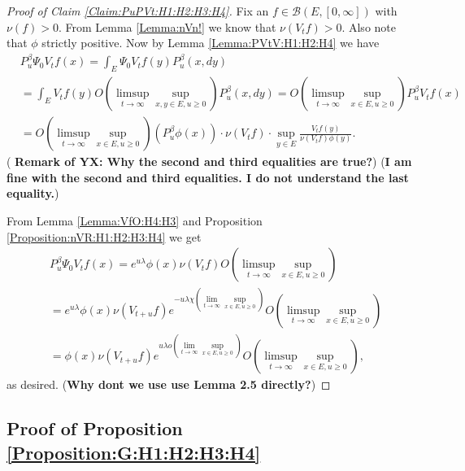 \documentclass[12pt,a4paper]{amsart}
\numberwithin{equation}{section}
\theoremstyle{plain}
\theoremstyle{definition}
\theoremstyle{remark}
\begin{document}
\begin{proof}[Proof of Claim \ref{Claim:PuPVt:H1:H2:H3:H4}]
Fix an $f\in \mathcal B(E,[0,\infty])$ with $\nu(f)>0$.
From Lemma \ref{Lemma:nVn!} we know that $\nu(V_tf)>0$.
Also note that $\phi$ strictly positive.
Now by Lemma \ref{Lemma:PVtV:H1:H2:H4}  we have
\begin{align}
 &P_u^\beta \Psi_0 V_{t} f(x)
 = \int_{E} \Psi_0V_tf(y) P_u^\beta (x,dy)
 \\&=\int_{E} V_tf(y) O(\limsup_{t\to \infty} \sup_{x,y\in E, u\geq 0}) P_u^\beta (x,dy)
 = O(\limsup_{t\to \infty}\sup_{x\in E,u\geq 0}) P_u^\beta V_t f(x)
  \\&= O(\limsup_{t\to \infty}\sup_{x\in E,u\geq 0}) (P_u^\beta \phi(x)) \cdot \nu(V_{t}f) \cdot\sup_{y\in E} \frac{V_tf(y)}{\nu(V_{t}f)\phi(y)}.
 \end{align}
( {\bf Remark of YX: Why the second and third equalities are true?})
({\bf I am fine with the second and third equalities. I do not understand the last equality.})
 
From Lemma \ref{Lemma:VfO:H4:H3} and Proposition \ref{Proposition:nVR:H1:H2:H3:H4} we get
\begin{align}
 &P_u^\beta \Psi_0 V_{t} f(x)
 = e^{u\lambda} \phi(x) \nu(V_tf)O(\limsup_{t\to \infty} \sup_{x\in E, u \geq 0})
 \\&= e^{u\lambda }\phi(x)\nu(V_{t+u}f) e^{-u \lambda \chi(\lim_{t\to \infty} \sup_{x\in E, u\geq 0})} O(\limsup_{t\to \infty} \sup_{x\in E, u\geq 0})
 \\&= \phi(x) \nu(V_{t+u}f) e^{u\lambda o(\lim_{t\to \infty} \sup_{x\in E, u\geq 0})} O(\limsup_{t\to \infty}\sup_{x\in E, u\geq 0}),
 \end{align}
as desired. ({\bf Why dont we use use Lemma 2.5 directly?})
\end{proof}
\subsection{Proof of Proposition \ref{Proposition:G:H1:H2:H3:H4}}
\end{document}
